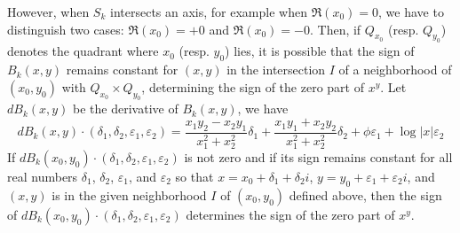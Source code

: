 \documentclass [12pt]{article}
\renewcommand {\epsilon}{\varepsilon}
\begin{document}
However, when $S_k$ intersects an axis, for example when $\Re(x_0) = 0$, we
have to distinguish two cases: $\Re(x_0) = +0$ and $\Re(x_0) = -0$.
Then, if $Q_{x_0}$ (resp. $Q_{y_0}$) denotes the quadrant where $x_0$
(resp. $y_0$) lies, it is possible that the sign of $B_k(x,y)$ remains
constant for $(x,y)$ in the intersection $I$ of a neighborhood of $(x_0, y_0)$
with $Q_{x_0}\times Q_{y_0}$, determining the sign of the zero part of $x^y$.
Let $dB_k(x,y)$ be the derivative of $B_k(x, y)$, we have
\begin {equation}
  \label {eqn:BkDerivative}
  dB_k(x, y)\cdot(\delta_1, \delta_2, \epsilon_1, \epsilon_2) =
  \frac{x_1y_2-x_2y_1}{x_1^2+x_2^2}\delta_1 +
  \frac{x_1y_1+x_2y_2}{x_1^2+x_2^2}\delta_2 +
  \phi\epsilon_1 +
  \log|x| \epsilon_2
\end {equation}
If $dB_k(x_0, y_0)\cdot(\delta_1, \delta_2, \epsilon_1, \epsilon_2)$ is not
zero and if its sign remains constant for all real numbers $\delta_1$,
$\delta_2$, $\epsilon_1$, and $\epsilon_2$ so that $x = x_0 + \delta_1 +
\delta_2i$, $y = y_0 +\epsilon_1 + \epsilon_2i$, and $(x,y)$ is in the given
neighborhood $I$ of $(x_0, y_0)$ defined above, then the sign of $dB_k(x_0,
y_0)\cdot(\delta_1, \delta_2, \epsilon_1, \epsilon_2)$ determines the sign of
the zero part of $x^y$.
\end{document}
